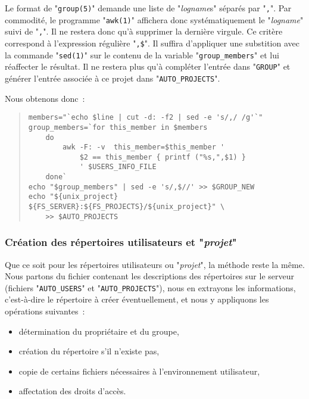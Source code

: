 Le format de "{\tt group(5)}" demande une liste de "{\sl logname}s" s{\'e}par{\'e}s
par "{\tt ,}". Par commodit{\'e}, le programme "{\tt awk(1)}" affichera donc
syst{\'e}matiquement le "{\sl logname}" suivi de "{\tt ,}". Il ne restera donc
qu'{\`a} supprimer la derni{\`e}re virgule. Ce crit{\`e}re correspond {\`a} l'expression r{\'e}guli{\`e}re
"\verb=,$=". Il suffira d'appliquer une substition avec la commande "{\tt sed(1)}"
sur le contenu de la variable "{\tt group\_members}" et lui r{\'e}affecter le r{\'e}sultat.
Il ne restera plus qu'{\`a} compl{\'e}ter l'entr{\'e}e dans "{\tt GROUP}" et g{\'e}n{\'e}rer l'entr{\'e}e
associ{\'e}e {\`a} ce projet dans "{\tt AUTO\_PROJECTS}".

Nous obtenons donc~:
\begin{quote}
\begin{verbatim}
members="`echo $line | cut -d: -f2 | sed -e 's/,/ /g'`"
group_members=`for this_member in $members
    do
        awk -F: -v  this_member=$this_member '
            $2 == this_member { printf ("%s,",$1) }
            ' $USERS_INFO_FILE
    done`
echo "$group_members" | sed -e 's/,$//' >> $GROUP_NEW
echo "${unix_project}   ${FS_SERVER}:${FS_PROJECTS}/${unix_project}" \
    >> $AUTO_PROJECTS
\end{verbatim}
\end{quote}

\subsubsection{\texorpdfstring{\label{adv-programming-ex3-devlmkdir}Cr{\'e}ation des r{\'e}pertoires utilisateurs et "{\sl projet}"}{Cr{\'e}ation des r{\'e}pertoires utilisateurs et "projet"}}

Que ce soit pour les r{\'e}pertoires utilisateurs ou "{\sl projet}", la m{\'e}thode reste la
m{\^e}me. Nous partons du fichier contenant les descriptions des r{\'e}pertoires sur le serveur
(fichiers "{\tt AUTO\_USERS}" et "{\tt AUTO\_PROJECTS}"), nous en extrayons les
informations, c'est-{\`a}-dire le r{\'e}pertoire {\`a} cr{\'e}er {\'e}ventuellement, et nous y appliquons
les op{\'e}rations suivantes~:
\begin{itemize}
	\item	d{\'e}termination du propri{\'e}taire et du groupe,
	\item	cr{\'e}ation du r{\'e}pertoire s'il n'existe pas,
	\item	copie de certains fichiers n{\'e}cessaires {\`a} l'environnement utilisateur,
	\item	affectation des droits d'acc{\`e}s.
\end{itemize}

